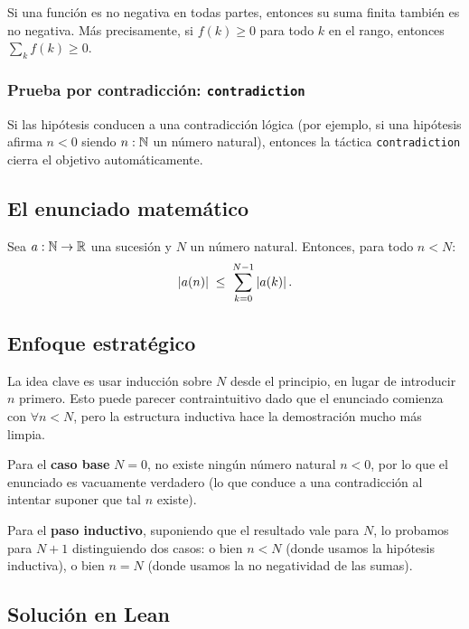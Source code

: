 Si una función es no negativa en todas partes, entonces su suma
finita también es no negativa. Más precisamente, si $f(k) \ge 0$
para todo $k$ en el rango, entonces $\sum_k f(k) \ge 0$.

\subsubsection{Prueba por contradicción: \texttt{contradiction}}

Si las hipótesis conducen a una contradicción lógica (por ejemplo, si
una hipótesis afirma $n < 0$ siendo $n : \mathbb{N}$ un número natural),
entonces la táctica \texttt{contradiction} cierra el objetivo
automáticamente.

\subsection{El enunciado matemático}

\begin{theorem}
  Sea $a : \mathbb{N} \to \mathbb{R}$ una sucesión y $N$ un número natural. Entonces,
  para todo $n < N$:
  \[
    \left|a(n)\right| \;\le\; \sum_{k=0}^{N-1} \left|a(k)\right|.
  \]
\end{theorem}

\subsection{Enfoque estratégico}

La idea clave es usar inducción sobre $N$ desde el principio, en
lugar de introducir $n$ primero. Esto puede parecer contraintuitivo
dado que el enunciado comienza con $\forall n < N$, pero la
estructura inductiva hace la demostración mucho más limpia.

Para el \textbf{caso base} $N = 0$, no existe ningún número natural
$n < 0$, por lo que el enunciado es vacuamente verdadero (lo que
conduce a una contradicción al intentar suponer que tal $n$ existe).

Para el \textbf{paso inductivo}, suponiendo que el resultado vale
para $N$, lo probamos para $N + 1$ distinguiendo dos casos: o bien
$n < N$ (donde usamos la hipótesis inductiva), o bien $n = N$ (donde
usamos la no negatividad de las sumas).

\subsection{Solución en Lean}

